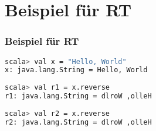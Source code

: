 	\section[Section]{Beispiel für RT}
	\begin{frame}[fragile]
		\frametitle{Beispiel für RT}
		\begin{lstlisting}[language=bash]
scala> val x = "Hello, World"
x: java.lang.String = Hello, World 
		
scala> val r1 = x.reverse 
r1: java.lang.String = dlroW ,olleH 
		
scala> val r2 = x.reverse 
r2: java.lang.String = dlroW ,olleH 
\end{lstlisting}	
\end{frame}